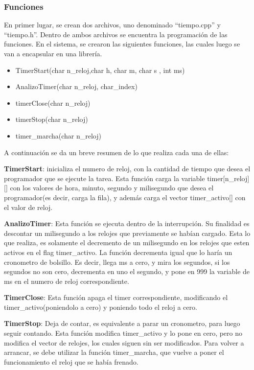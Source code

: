 \subsubsection{Funciones}

En primer lugar, se crean dos archivos, uno denominado ``tiempo.cpp''  y ``tiempo.h''. Dentro de ambos archivos se encuentra la programación de las funciones. En el sistema, se crearon las siguientes funciones, las cuales luego se van a encapsular en una librería.  

\begin{itemize}
\item TimerStart(char n\_reloj,char h, char m, char s , int ms)
\item AnalizoTimer(char n\_reloj, char\_index) 
\item timerClose(char n\_reloj) 
\item timerStop(char n\_reloj)
\item timer\_marcha(char n\_reloj) 
\end{itemize}

A continuación se da un breve resumen de lo que realiza cada una de ellas: 

\textbf{TimerStart}:  inicializa el numero de reloj, con la cantidad de tiempo que desea el programador que se ejecute la tarea. Esta función carga la variable timer[n\_reloj][] con los valores de hora, minuto, segundo y milisegundo que desea el programador(es decir, carga la fila), y además carga el vector timer\_activo[] con el valor de reloj. 

\textbf{AnalizoTimer}: Esta función se ejecuta dentro de la interrupción. Su finalidad es descontar un milisegundo a los relojes que previamente se habían cargado. Esta lo que realiza, es solamente el decremento de un milisegundo en los relojes que esten activos en el flag timer\_activo. La función decrementa igual que lo haría un cronometro de bolsillo. Es decir, llega ms a cero, y mira los segundos, si los segundos no son cero, decrementa en uno el segundo, y pone en 999 la variable de ms en el numero de reloj correspondiente.  

\textbf{TimerClose}: Esta función apaga el timer correspondiente, modificando el timer\_activo(poniendolo a cero) y poniendo todo el reloj a cero. 

\textbf{TimerStop}: Deja de contar, es equivalente a parar un cronometro, para luego seguir contando. Esta función modifica timer\_activo y lo pone en cero, pero no modifica el vector de relojes, los cuales siguen sin ser modificados. Para volver a arrancar, se debe utilizar la función timer\_marcha, que vuelve a poner el funcionamiento el reloj que se había frenado. 


